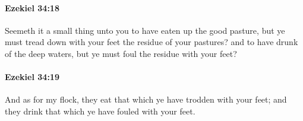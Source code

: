 		\paragraph{Ezekiel 34:18} %
			\label{EZEKIEL-34-18}

			Seemeth it a small thing unto you to have eaten up the good pasture, but ye must tread down with your feet the residue of your pastures? and to have drunk of the deep waters, but ye must foul the residue with your feet?


		\paragraph{Ezekiel 34:19} %
			\label{EZEKIEL-34-19}

			And as for my flock, they eat that which ye have trodden with your feet; and they drink that which ye have fouled with your feet.



